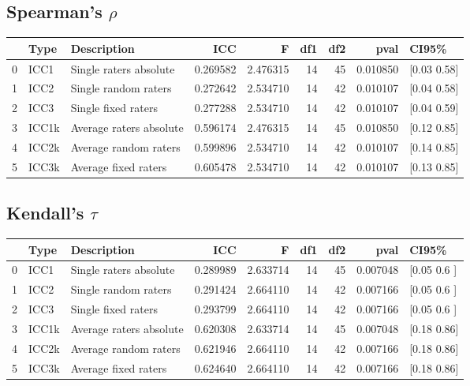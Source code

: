 \documentclass{article}
\begin{document}
\subsection{Spearman's $\rho$}
\begin{center}
    \begin{tabular}{lllrrrrrl}
        \toprule
          & Type  & Description             & ICC      & F        & df1 & df2 & pval     & CI95\%      \\
        \midrule
        0 & ICC1  & Single raters absolute  & 0.269582 & 2.476315 & 14  & 45  & 0.010850 & [0.03 0.58] \\
        1 & ICC2  & Single random raters    & 0.272642 & 2.534710 & 14  & 42  & 0.010107 & [0.04 0.58] \\
        2 & ICC3  & Single fixed raters     & 0.277288 & 2.534710 & 14  & 42  & 0.010107 & [0.04 0.59] \\
        3 & ICC1k & Average raters absolute & 0.596174 & 2.476315 & 14  & 45  & 0.010850 & [0.12 0.85] \\
        4 & ICC2k & Average random raters   & 0.599896 & 2.534710 & 14  & 42  & 0.010107 & [0.14 0.85] \\
        5 & ICC3k & Average fixed raters    & 0.605478 & 2.534710 & 14  & 42  & 0.010107 & [0.13 0.85] \\
        \bottomrule
    \end{tabular}

\end{center}


\subsection{Kendall's $\tau$}
\begin{center}
    \begin{tabular}{lllrrrrrl}
        \toprule
          & Type  & Description             & ICC      & F        & df1 & df2 & pval     & CI95\%      \\
        \midrule
        0 & ICC1  & Single raters absolute  & 0.289989 & 2.633714 & 14  & 45  & 0.007048 & [0.05 0.6 ] \\
        1 & ICC2  & Single random raters    & 0.291424 & 2.664110 & 14  & 42  & 0.007166 & [0.05 0.6 ] \\
        2 & ICC3  & Single fixed raters     & 0.293799 & 2.664110 & 14  & 42  & 0.007166 & [0.05 0.6 ] \\
        3 & ICC1k & Average raters absolute & 0.620308 & 2.633714 & 14  & 45  & 0.007048 & [0.18 0.86] \\
        4 & ICC2k & Average random raters   & 0.621946 & 2.664110 & 14  & 42  & 0.007166 & [0.18 0.86] \\
        5 & ICC3k & Average fixed raters    & 0.624640 & 2.664110 & 14  & 42  & 0.007166 & [0.18 0.86] \\
        \bottomrule
    \end{tabular}
\end{center}
\end{document}
